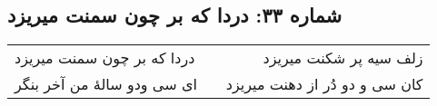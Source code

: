 \begin{center}
\section*{شماره ۳۳: دردا که بر چون سمنت میریزد}
\label{sec:033}
\begin{longtable}{l p{0.5cm} r}
دردا که بر چون سمنت میریزد
&&
زلف سیه پر شکنت میریزد
\\
ای سی ودو سالهٔ من آخر بنگر
&&
کان سی و دو دُر از دهنت میریزد
\\
\end{longtable}
\end{center}
